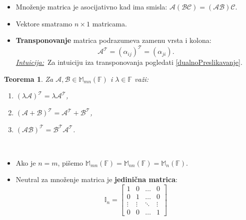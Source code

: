 \documentclass[a4paper,12pt,twoside]{report}
\newtheorem{theorem}{Teorema}[section]
\numberwithin{algorithm}{section}
\newcommand{\intuicija}{\noindent\underline{\textit{Intuicija:}}\ }
\begin{document}
\begin{itemize}
\[\begin{bmatrix}
        \displaystyle \sum_{r=1}^{n} \alpha_{1r}\beta_{r2} & 
        \dots & 
        \displaystyle \sum_{r=1}^{n} \alpha_{1r}\beta_{rk} \\[10pt]
        \displaystyle \sum_{r=1}^{n} \alpha_{2r}\beta_{r1} & 
        \displaystyle \sum_{r=1}^{n} \alpha_{2r}\beta_{r2} & 
        \dots & 
        \displaystyle \sum_{r=1}^{n} \alpha_{2r}\beta_{rk} \\[10pt]
        \vdots & \vdots & \ddots & \vdots \\[10pt]
        \displaystyle \sum_{r=1}^{n} \alpha_{mr}\beta_{r1} & 
        \displaystyle \sum_{r=1}^{n} \alpha_{mr}\beta_{r2} & 
        \dots & 
        \displaystyle \sum_{r=1}^{n} \alpha_{mr}\beta_{rk}
        \end{bmatrix}.
    \]
    \intuicija Množenje matrica predstavlja kompoziciju linearnih preslikavanja (videti \ref{linearniOperator}). Izraz $\mathcal{AB}v$ zapravo predstavlja 
    primenu operatora $B$ na $v$, a zatim primenu operatora $A$ na vektor $\mathcal{B}v$. Sve ovo je detaljno objašnjeno u \ref{linearniOperator}.
    \item Množenje matrica je asocijativno kad ima smisla: $\mathcal{A}(\mathcal{BC}) = (\mathcal{AB})\mathcal{C}$.
    \item Vektore smatramo $n \times 1$ matricama. 
    \item \textbf{Transponovanje} matrica podrazumeva zamenu vrsta i kolona: \[\mathcal{A}^\mathcal{T} = (\alpha_{ij})^\mathcal{T} = (\alpha_{ji}).\]
    \intuicija Za intuiciju iza transponovanja pogledati \ref{dualnoPreslikavanje}.
\end{itemize}

\begin{theorem}
    Za $\mathcal{A, B} \in \mathbb{M}_{mn}(\mathbb{F})$ i $\lambda \in \mathbb{F}$ važi:
    \begin{enumerate}
        \item $(\lambda \mathcal{A})^\mathcal{T} = \lambda \mathcal{A}^\mathcal{T}$,
        \item $(\mathcal{A} + \mathcal{B})^\mathcal{T} = \mathcal{A}^\mathcal{T} + \mathcal{B}^\mathcal{T}$,
        \item $(\mathcal{AB})^\mathcal{T} = \mathcal{B^TA^T}$.
    \end{enumerate} 
\end{theorem}\

\begin{itemize}
    \item Ako je $n = m$, pišemo $\mathbb{M}_{mn}(\mathbb{F}) = \mathbb{M}_{nn}(\mathbb{F}) = \mathbb{M}_n(\mathbb{F})$.
    \item Neutral za množenje matrica je \textbf{jedinična matrica}:
    \[ \mathbb{I}_n = \begin{bmatrix}
        1 & 0 & \dots & 0 \\
        0 & 1 & \dots & 0 \\
        \vdots & \vdots & \ddots & \vdots \\
        0 & 0 & \dots & 1
    \end{bmatrix} \]
\end{itemize}
\end{document}
